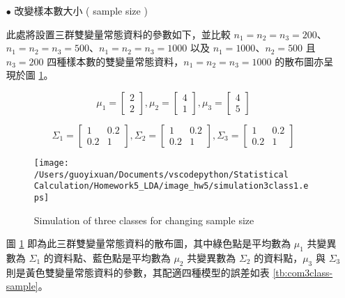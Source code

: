 \begin{itemize}
\item[$\bullet$] 改變樣本數大小 ( sample size )

此處將設置三群雙變量常態資料的參數如下，並比較 $n_1=n_2=n_3=200$、$n_1=n_2=n_3=500$、$n_1=n_2=n_3=1000$ 以及 $n_1=1000$、$n_2=500$ 且 $n_3=200$ 四種樣本數的雙變量常態資料，$n_1=n_2=n_3=1000$ 的散布圖亦呈現於圖 \ref{fig:sample size 3 class}。

$$ \mu_1 = \left[
            \begin{array}{clr}
                2  \\
                2 
            \end{array} \right] ,
            \mu_2 = \left[
            \begin{array}{clr}
                4  \\
                1 
            \end{array} \right],
            \mu_3 = \left[
            \begin{array}{clr}
                4  \\
                5 
            \end{array} \right]$$ 

$$ \Sigma_1 = \left[
            \begin{array}{clr}
                1 & 0.2  \\
                0.2 & 1
            \end{array} \right] ,
            \Sigma_2 = \left[
            \begin{array}{clr}
                1 & 0.2  \\
                0.2 & 1 
            \end{array} \right]  ,
            \Sigma_3 = \left[
            \begin{array}{clr}
                1 & 0.2  \\
                0.2 & 1 
            \end{array} \right] $$

\begin{figure}[H]
    \centering
        \texttt{[image: /Users/guoyixuan/Documents/vscodepython/Statistical Calculation/Homework5\_LDA/image\_hw5/simulation3class1.eps]}
    \caption{Simulation of three classes for changing sample size}
    \label{fig:sample size 3 class}
\end{figure} 

圖 \ref{fig:sample size 3 class} 即為此三群雙變量常態資料的散布圖，其中綠色點是平均數為 $\mu_1$ 共變異數為 $\Sigma_1$ 的資料點、藍色點是平均數為 $\mu_2$ 共變異數為 $\Sigma_2$ 的資料點，$\mu_3$ 與 $\Sigma_3$ 則是黃色雙變量常態資料的參數，其配適四種模型的誤差如表 \ref{tb:com3class-sample}。


\end{itemize}
